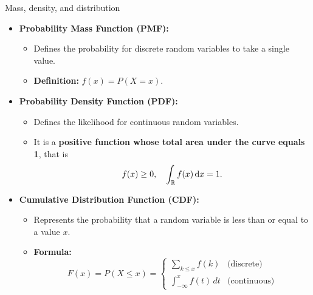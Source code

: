 \documentclass[aspectratio=169]{beamer}
\begin{document}
\begin{frame}{Mass, density, and distribution}
    \begin{itemize}
        \item \textbf{Probability Mass Function (PMF):}
        \begin{itemize}
            \item[$\bullet$] Defines the probability for discrete random variables to take a single value.
            \item[$\bullet$] \textbf{Definition:} \(f(x) = P(X = x)\).
        \end{itemize}
        \item \textbf{Probability Density Function (PDF):}
        \begin{itemize}
            \item[$\bullet$] Defines the likelihood for continuous random variables.
            \item[$\bullet$] It is a \textbf{positive function whose total area under the curve equals 1}, that is
            $$
            f(x) \geq 0,\quad \int_{\mathbb{R}}f(x)\, \mathrm{d}x = 1.
            $$
        \end{itemize}
        \item \textbf{Cumulative Distribution Function (CDF):}
        \begin{itemize}
            \item[$\bullet$] Represents the probability that a random variable is less than or equal to a value \(x\).
            \item[$\bullet$] \textbf{Formula:}
            $$
            F(x) = P(X \leq x) =
            \begin{cases}
                \sum_{k \leq x} f(k) & \text{(discrete)} \\
                \int_{-\infty}^x f(t) \, dt & \text{(continuous)}
            \end{cases}
            $$
        \end{itemize}
    \end{itemize}
\end{frame}
\end{document}
